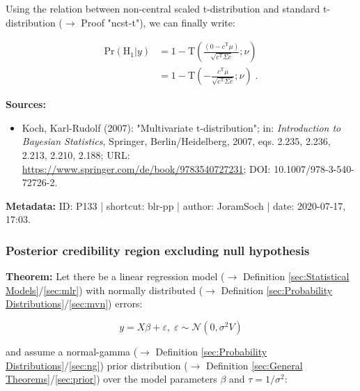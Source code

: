 \documentclass[a4paper,12pt,twoside]{book}
\begin{document}
Using the relation between non-central scaled t-distribution and standard t-distribution ($\rightarrow$ Proof "ncst-t"), we can finally write:

\begin{equation} \label{eq:blr-pp-GLM-NG-post-prob-H0-s2}
\begin{split}
\mathrm{Pr}\left( \mathrm{H}_1 | y \right) &= 1 - \mathrm{T}\left( \frac{(0 - c^\mathrm{T} \mu)}{\sqrt{c^\mathrm{T} \Sigma c}}; \nu \right) \\
&= 1 - \mathrm{T}\left( -\frac{c^\mathrm{T} \mu}{\sqrt{c^\mathrm{T} \Sigma c}}; \nu \right) \; .
\end{split}
\end{equation}


\vspace{1em}
\textbf{Sources:}
\begin{itemize}
\item Koch, Karl-Rudolf (2007): "Multivariate t-distribution"; in: \textit{Introduction to Bayesian Statistics}, Springer, Berlin/Heidelberg, 2007, eqs. 2.235, 2.236, 2.213, 2.210, 2.188; URL: \url{https://www.springer.com/de/book/9783540727231}; DOI: 10.1007/978-3-540-72726-2.
\end{itemize}


\vspace{1em}
\textbf{Metadata:} ID: P133 | shortcut: blr-pp | author: JoramSoch | date: 2020-07-17, 17:03.
\vspace{1em}



\subsubsection[\textbf{Posterior credibility region excluding null hypothesis}]{Posterior credibility region excluding null hypothesis} \label{sec:blr-pcr}
\setcounter{equation}{0}

\textbf{Theorem:} Let there be a linear regression model ($\rightarrow$ Definition \ref{sec:Statistical Models}/\ref{sec:mlr}) with normally distributed ($\rightarrow$ Definition \ref{sec:Probability Distributions}/\ref{sec:mvn}) errors:

\begin{equation} \label{eq:blr-pcr-GLM}
y = X \beta + \varepsilon, \; \varepsilon \sim \mathcal{N}(0, \sigma^2 V)
\end{equation}

and assume a normal-gamma ($\rightarrow$ Definition \ref{sec:Probability Distributions}/\ref{sec:ng}) prior distribution ($\rightarrow$ Definition \ref{sec:General Theorems}/\ref{sec:prior}) over the model parameters $\beta$ and $\tau = 1/\sigma^2$:
\end{document}

